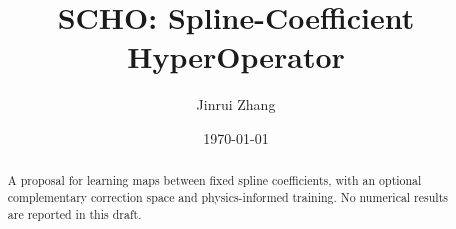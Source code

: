 \documentclass{article}
\title{SCHO: Spline-Coefficient HyperOperator}
\author{Jinrui Zhang}
\date{\today}
\begin{document}
\maketitle
\begin{abstract}
    A proposal for learning maps between fixed spline coefficients, with an
    optional complementary correction space and physics-informed training.
    No numerical results are reported in this draft.
\end{abstract}
\tableofcontents
\newpage

\end{document}
